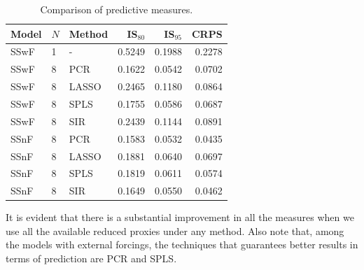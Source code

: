 \documentclass[11pt]{amsart}
\theoremstyle{plain}
\theoremstyle{definition}
\theoremstyle{remark}
\begin{document}
\begin{table}
  \centering
\begin{tabular}{lll|rrr}
  \toprule
 \textbf{Model} & $N$ & \textbf{Method} & IS$_{80}$ & IS$_{95}$ & CRPS \\ 
  \midrule
  SSwF & 1 & - & 0.5249 & 0.1988 & 0.2278 \\
  \midrule
  SSwF & 8 & PCR & 0.1622 & 0.0542 & 0.0702 \\ 
  SSwF & 8 & LASSO & 0.2465 & 0.1180 & 0.0864 \\ 
  SSwF & 8 & SPLS & 0.1755 & 0.0586 & 0.0687 \\ 
  SSwF & 8 & SIR & 0.2439 & 0.1144 & 0.0891 \\
  \midrule
  SSnF & 8 & PCR & 0.1583 & 0.0532 & 0.0435 \\ 
  SSnF & 8 & LASSO & 0.1881 & 0.0640 & 0.0697 \\ 
  SSnF & 8 & SPLS & 0.1819 & 0.0611 & 0.0574 \\ 
  SSnF & 8 & SIR & 0.1649 & 0.0550 & 0.0462 \\ 
   \bottomrule
\end{tabular}
  \caption{Comparison of predictive measures.}
  \label{tab:comparisontot}
\end{table}


It is evident that there is a substantial improvement
in all the measures when we use all the available reduced proxies under any
method. Also note that, among the models with external forcings, the techniques that
guarantees better results in terms of prediction are PCR and SPLS.
\end{document}
